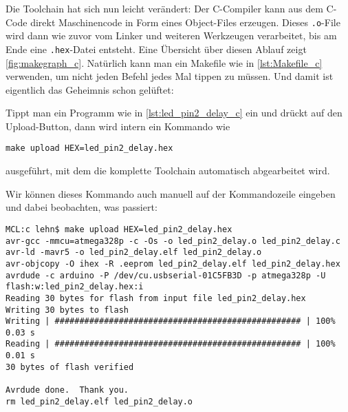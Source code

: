 \documentclass[a4paper,12pt]{article}
\begin{document}
\noindent
Die Toolchain hat sich nun leicht verändert: Der C-Compiler kann aus dem C-Code
direkt Maschinencode in Form eines Object-Files erzeugen. Dieses
\texttt{.o}-File wird dann wie zuvor vom Linker und weiteren Werkzeugen
verarbeitet, bis am Ende eine \texttt{.hex}-Datei entsteht. Eine Übersicht über
diesen Ablauf zeigt \autoref{fig:makegraph_c}. Natürlich kann man ein Makefile
wie in \autoref{lst:Makefile_c} verwenden, um nicht jeden Befehl jedes Mal
tippen zu müssen. Und damit ist eigentlich das Geheimnis schon gelüftet:

\begin{tcolorbox}[
	colback=myblue!5!white, colframe=myblue, 
	title=Was passiert beim Klick auf „Upload“?
]
Tippt man ein Programm wie in \autoref{lst:led_pin2_delay_c} ein und drückt auf
den Upload-Button, dann wird intern ein Kommando wie

\texttt{make upload HEX=led\_pin2\_delay.hex}

ausgeführt, mit dem die komplette Toolchain automatisch abgearbeitet wird.
\end{tcolorbox}

\noindent
Wir können dieses Kommando auch manuell auf der Kommandozeile eingeben und
dabei beobachten, was passiert:

\begin{lstlisting}
MCL:c lehn$ make upload HEX=led_pin2_delay.hex
avr-gcc -mmcu=atmega328p -c -Os -o led_pin2_delay.o led_pin2_delay.c
avr-ld -mavr5 -o led_pin2_delay.elf led_pin2_delay.o
avr-objcopy -O ihex -R .eeprom led_pin2_delay.elf led_pin2_delay.hex
avrdude -c arduino -P /dev/cu.usbserial-01C5FB3D -p atmega328p -U flash:w:led_pin2_delay.hex:i
Reading 30 bytes for flash from input file led_pin2_delay.hex
Writing 30 bytes to flash
Writing | ################################################## | 100% 0.03 s
Reading | ################################################## | 100% 0.01 s
30 bytes of flash verified

Avrdude done.  Thank you.
rm led_pin2_delay.elf led_pin2_delay.o
\end{lstlisting}
\end{document}
